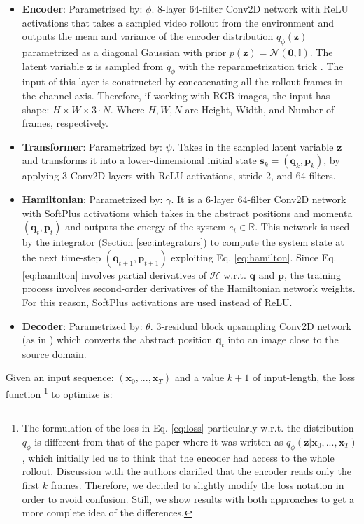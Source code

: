 \begin{itemize}
    \item \textbf{Encoder}: Parametrized by: $\phi$. 8-layer 64-filter Conv2D network with ReLU activations that takes a sampled video rollout from the environment and outputs the mean and variance of the encoder distribution $q_\phi (\bm{z})$ parametrized as a diagonal Gaussian with prior $p(\bm{z}) = \mathcal{N}(\bm{0}, \mathbb{I})$. The latent variable $\bm{z}$ is sampled from $q_{\phi}$ with the reparametrization trick \cite{vae}. The input of this layer is constructed by concatenating all the rollout frames in the channel axis. Therefore, if working with RGB images, the input has shape: $H \times W \times 3 \cdot N$. Where $H, W, N$ are Height, Width, and Number of frames, respectively. 
    \item \textbf{Transformer}: Parametrized by: $\psi$. Takes in the sampled latent variable $\bm{z}$ and transforms it into a lower-dimensional initial state $\bm{s}_k = (\bm{q}_k, \bm{p}_k)$, by applying 3 Conv2D layers with ReLU activations, stride 2, and 64 filters.
    \item \textbf{Hamiltonian}: Parametrized by: $\gamma$. It is a 6-layer 64-filter Conv2D network with SoftPlus activations which takes in the abstract positions and momenta $(\bm{q}_t, \bm{p}_t)$ and outputs the energy of the system $e_t \in \mathbb{R}$. This network is used by the integrator (Section \ref{sec:integrators}) to compute the system state at the next time-step $(\bm{q}_{t+1}, \bm{p}_{t+1})$ exploiting Eq. \ref{eq:hamilton}. Since Eq. \ref{eq:hamilton} involves partial derivatives of $\mathcal{H}$ w.r.t. $\bm{q}$ and $\bm{p}$, the training process involves second-order derivatives of the Hamiltonian network weights. For this reason, SoftPlus activations are used instead of ReLU. 
    \item \textbf{Decoder}: Parametrized by: $\theta$. 3-residual block upsampling Conv2D network (as in \cite{karras2018progressive}) which converts the abstract position $\bm{q}_t$ into an image close to the source domain.
\end{itemize}

Given an input sequence: $(\bm{x}_0, ..., \bm{x}_T)$ and a value $k + 1$ of input-length, the loss function
\footnote{The formulation of the loss in Eq. \ref{eq:loss} particularly w.r.t. the distribution $q_{\phi}$ is different from that of the paper\cite{hgn} where it was written as $q_{\phi}(\bm{z} \vert \bm{x}_0, ..., \bm{x}_T)$, which initially led us to think that the encoder had access to the whole rollout. Discussion with the authors clarified that the encoder reads only the first $k$ frames. Therefore, we decided to slightly modify the loss notation in order to avoid confusion. Still, we show results with both approaches to get a more complete idea of the differences.}
to optimize is:

